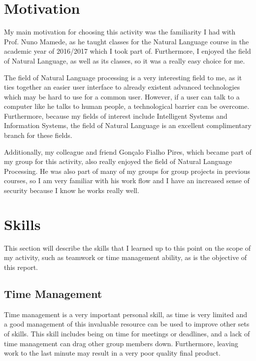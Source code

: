 \documentclass[a4paper,12pt,journal,twoside,compsoc]{PPIEEEtran}
\begin{document}
\section{Motivation}
\label{motivation}

My main motivation for choosing this activity was the familiarity I had with Prof. Nuno Mamede, as he taught classes for the Natural Language course in the academic year of 2016/2017 which I took part of. Furthermore, I enjoyed the field of Natural Language, as well as its classes, so it was a really easy choice for me. 

The field of Natural Language processing is a very interesting field to me, as it ties together an easier user interface to already existent advanced technologies which may be hard to use for a common user. However, if a user can talk to a computer like he talks to human people, a technological barrier can be overcome. Furthermore, because my fields of interest include Intelligent Systems and Information Systems, the field of Natural Language is an excellent complimentary branch for these fields.

Additionally, my colleague and friend Gonçalo Fialho Pires, which became part of my group for this activity, also really enjoyed the field of Natural Language Processing. He was also part of many of my groups for group projects in previous courses, so I am very familiar with his work flow and I have an increased sense of security because I know he works really well. 


\section{Skills}
\label{skills}

This section will describe the skills that I learned up to this point on the scope of my activity, such as teamwork or time management ability, as is the objective of this report.

\subsection{Time Management}

Time management is a very important personal skill, as time is very limited and a good management of this invaluable resource can be used to improve other sets of skills. This skill includes being on time for meetings or deadlines, and a lack of time management can drag other group members down. Furthermore, leaving work to the last minute may result in a very poor quality final product.
\end{document}
